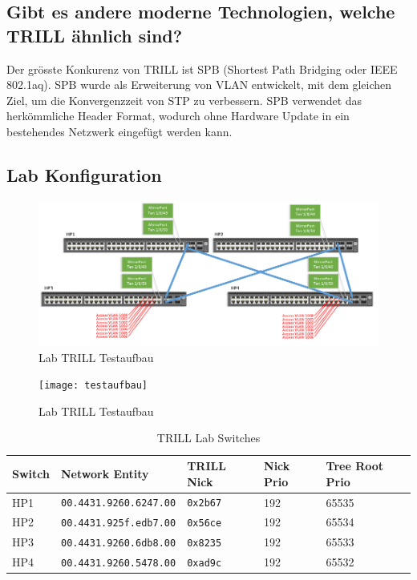 \subsection{Gibt es andere moderne Technologien, welche TRILL ähnlich sind?}%
Der grösste Konkurenz von TRILL ist SPB (Shortest Path Bridging oder IEEE 802.1aq). SPB wurde als Erweiterung von VLAN entwickelt, mit dem gleichen Ziel, um die Konvergenzzeit von STP zu verbessern. SPB verwendet das herkömmliche Header Format, wodurch ohne Hardware Update in ein bestehendes Netzwerk eingefügt werden kann. 


\subsection{Lab Konfiguration}\label{sec:lab-konfiguration}
\begin{figure}[H]
	\centering
	\includegraphics[width=0.7\linewidth]{trill_network_layer2}
	\caption{Lab TRILL Testaufbau}
	\label{fig:trillnetworklayer2}
\end{figure}
\begin{figure}[H]
	\centering
	\texttt{[image: testaufbau]}
	\caption{Lab TRILL Testaufbau}
	\label{fig:testaufbau}
\end{figure}

\begin{table}[H]
	\centering
	\begin{tabu} to \linewidth {l l l l l}
		\toprule
		Switch & Network Entity & TRILL Nick & Nick Prio & Tree Root Prio \\
		\midrule
		HP1 & \lstinline|00.4431.9260.6247.00| & \lstinline|0x2b67| & 192 & 65535 \\
		HP2 & \lstinline|00.4431.925f.edb7.00| & \lstinline|0x56ce| & 192 & 65534 \\
		HP3 & \lstinline|00.4431.9260.6db8.00| & \lstinline|0x8235| & 192 & 65533 \\
		HP4 & \lstinline|00.4431.9260.5478.00| & \lstinline|0xad9c| & 192 & 65532 \\
		\bottomrule
	\end{tabu}
	\label{tbl:Labdevices}
	\caption{TRILL Lab Switches}
\end{table}

